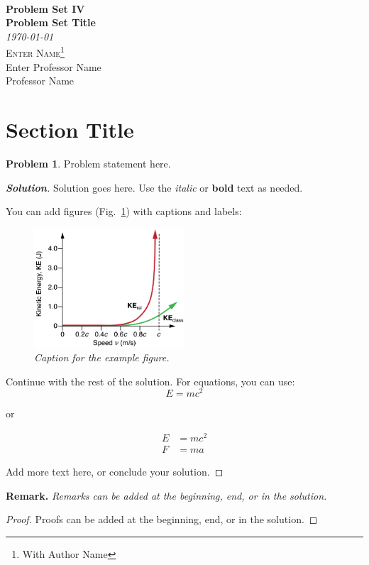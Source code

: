 \documentclass[12pt]{article}
\newcommand{\SheetTitle}[3]{
  {\noindent\Huge\bf  \\[0.5\baselineskip] {\fontfamily{cmr}\selectfont  Problem Set IV}}\\[2\baselineskip] %
  { {\bf \fontfamily{cmr}\selectfont #1}\\ {\textit{\fontfamily{cmr}\selectfont \today}}}    ~~~~~~~~~~~~~~~~~~~~~~~~~~~~~~~~~~~~~~~~~~~~~~~~~~~~~~~~     {\large \textsc{Enter Name}\thanks{With #3}} \\
  {Enter Professor Name}
  \\[1.4\baselineskip]}
\theoremstyle{definition}
\newtheorem{p}{Problem}
\newenvironment{solution}
  {\begin{mdframed}[linewidth=0.5pt, roundcorner=10pt, linecolor=black]\begin{proof}[\bfseries Solution]}
  {\qedhere\end{proof}\end{mdframed}}
\newenvironment{remark}
  {\begin{mdframed}[linewidth=0.5pt, roundcorner=10pt, linecolor=black]
   \textbf{Remark.} \itshape}
  {\end{mdframed}}
\begin{document}
\SheetTitle{Problem Set Title}{Course Name}{Author Name}{Professor Name}

\section{Section Title}

\vspace{0.9cm}
\begin{p}
  Problem statement here.
\end{p}

\begin{solution}
  Solution goes here. Use the \emph{italic} or \textbf{bold} text as needed.
  
  You can add figures (Fig.~\ref{fig:example}) with captions and labels:
  \begin{figure}[H]
    \centering
    \includegraphics[width=0.5\textwidth]{figures/example.jpg}
    \caption{\emph{Caption for the example figure.}}
    \label{fig:example}
  \end{figure}

  Continue with the rest of the solution. For equations, you can use:
  \begin{equation}
    E = mc^2
  \end{equation}

  or 

  \begin{align*}
    E &= mc^2 \\
    F &= ma
  \end{align*}

  
  Add more text here, or conclude your solution.

\end{solution}

\begin{remark}
  Remarks can be added at the beginning, end, or in the solution.
\end{remark}

\vspace{\lineskip}

\begin{proof}
  Proofs can be added at the beginning, end, or in the solution.
\end{proof}


\end{document}
